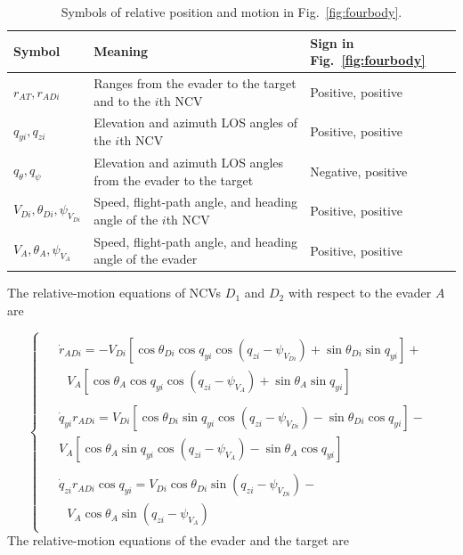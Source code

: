 \begin{table}[!ht]
\centering
\caption{Symbols of relative position and motion in Fig.~\ref{fig:fourbody}.}
\label{tab:symbols}
\small
\begin{tabularx}{\linewidth}{lXX}
\toprule
Symbol & Meaning & Sign in Fig.~\ref{fig:fourbody} \\
\midrule
${r_{AT}},{r_{ADi}}$ & Ranges from the evader to the target and to the $i$th NCV & Positive, positive \\
${q_{yi}},{q_{zi}}$ & Elevation and azimuth LOS angles of the $i$th NCV & Positive, positive \\
${q_\theta },{q_\psi }$ & Elevation and azimuth LOS angles from the evader to the target & Negative, positive \\
${V_{Di}},{\theta _{Di}},{\psi _{{V_{Di}}}}$ & Speed, flight-path angle, and heading angle of the $i$th NCV & Positive, positive \\
${V_A},{\theta _A},{\psi _{{V_A}}}$ & Speed, flight-path angle, and heading angle of the evader & Positive, positive \\
\bottomrule
\end{tabularx}
\end{table}
\FloatBarrier
The relative-motion equations of NCVs ${D_1}$ and ${D_2}$ with respect to the evader $A$ are

\begin{equation}
\label{eq:1}
\left\{ {\begin{array}{*{20}{l}}
  \begin{aligned}
& {{\dot r}_{ADi}} =  - {V_{Di}}\left[ {\cos {\theta _{Di}}\cos {q_{yi}}\cos \left( {{q_{zi}} - {\psi _{{V_{Di}}}}} \right) + \sin {\theta _{Di}}\sin {q_{yi}}} \right] +  \\
& {\text{   }}{V_A}\left[ {\cos {\theta _A}\cos {q_{yi}}\cos \left( {{q_{zi}} - {\psi _{{V_A}}}} \right) + \sin {\theta _A}\sin {q_{yi}}} \right]
\end{aligned} \\
  \begin{aligned}
& {{\dot q}_{yi}}{r_{ADi}} = {V_{Di}}\left[ {\cos {\theta _{Di}}\sin {q_{yi}}\cos \left( {{q_{zi}} - {\psi _{{V_{Di}}}}} \right) - \sin {\theta _{Di}}\cos {q_{yi}}} \right] -  \\
& {V_A}\left[ {\cos {\theta _A}\sin {q_{yi}}\cos \left( {{q_{zi}} - {\psi _{{V_A}}}} \right) - \sin {\theta _A}\cos {q_{yi}}} \right]
\end{aligned} \\
  \begin{aligned}
& {{\dot q}_{zi}}{r_{ADi}}\cos {q_{yi}} = {V_{Di}}\cos {\theta _{Di}}\sin \left( {{q_{zi}} - {\psi _{{V_{Di}}}}} \right) -  \\
& {\text{           }}{V_A}\cos {\theta _A}\sin \left( {{q_{zi}} - {\psi _{{V_A}}}} \right)
\end{aligned}
\end{array}} \right.
\end{equation}
The relative-motion equations of the evader and the target are

